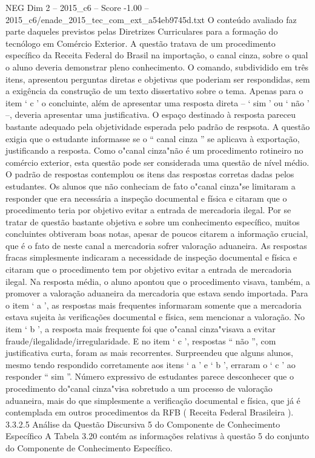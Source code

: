 \begin{textsample}{NEG Dim 2 – 2015\_c6 – Score -1.00 – 2015\_c6/enade\_2015\_tec\_com\_ext\_a54eb9745d.txt}
O conteúdo avaliado faz parte daqueles previstos pelas Diretrizes Curriculares para a formação do tecnólogo em Comércio Exterior.
A questão tratava de um procedimento específico da Receita Federal do Brasil na importação, o canal cinza, sobre o qual o aluno deveria demonstrar pleno conhecimento.
O comando, subdividido em três itens, apresentou perguntas diretas e objetivas que poderiam ser respondidas, sem a exigência da construção de um texto dissertativo sobre o tema.
Apenas para o item ‘ c ’ o concluinte, além de apresentar uma resposta direta – ‘ sim ’ ou ‘ não ’ –, deveria apresentar uma justificativa.
O espaço destinado à resposta pareceu bastante adequado pela objetividade esperada pelo padrão de respsota.
A questão exigia que o estudante informasse se o “ canal cinza ” se aplicava à exportação, justificando a resposta.
Como o"canal cinza"não é um procedimento rotineiro no comércio exterior, esta questão pode ser considerada uma questão de nível médio.
O padrão de respostas contemplou os itens das respostas corretas dadas pelos estudantes.
Os alunos que não conheciam de fato o"canal cinza"se limitaram a responder que era necessária a inspeção documental e física e citaram que o procedimento teria por objetivo evitar a entrada de mercadoria ilegal.
Por se tratar de questão bastante objetiva e sobre um conhecimento específico, muitos concluintes obtiveram boas notas, apesar de poucos citarem a informação crucial, que é o fato de neste canal a mercadoria sofrer valoração aduaneira.
As respostas fracas simplesmente indicaram a necessidade de inspeção documental e física e citaram que o procedimento tem por objetivo evitar a entrada de mercadoria ilegal.
Na resposta média, o aluno apontou que o procedimento visava, também, a promover a valoração aduaneira da mercadoria que estava sendo importada.
Para o item ‘ a ’, as respostas mais frequentes informaram somente que a mercadoria estava sujeita às verificações documental e física, sem mencionar a valoração.
No item ‘ b ’, a resposta mais frequente foi que o"canal cinza"visava a evitar fraude/ilegalidade/irregularidade.
E no item ‘ c ’, respostas “ não ”, com justificativa curta, foram as mais recorrentes.
Surpreendeu que alguns alunos, mesmo tendo respondido corretamente aos itens ‘ a ’ e ‘ b ’, erraram o ‘ c ’ ao responder “ sim ”.
Número expressivo de estudantes parece desconhecer que o procedimento do"canal cinza"visa sobretudo a um processo de valoração aduaneira, mais do que simplesmente a verificação documental e física, que já é contemplada em outros procedimentos da RFB ( Receita Federal Brasileira ). 3.3.2.5 Análise da Questão Discursiva 5 do Componente de Conhecimento Específico A Tabela 3.20 contém as informações relativas à questão 5 do conjunto do Componente de Conhecimento Específico.

\end{textsample}
